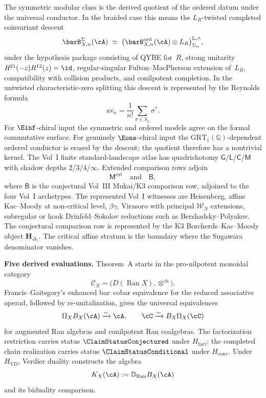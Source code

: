 The symmetric modular class is the derived quotient of the ordered
datum under the universal conductor. In the braided case this means
the $L_R$-twisted completed coinvariant descent
\[
 \barB^\Sigma_{X,n}(\cA)
 \;\simeq\;
 \bigl(\barB^{\mathrm{ord}}_{X,n}(\cA)\otimes L_R\bigr)
 ^{\mathbb L,\wedge}_{\Sigma_n},
\]
under the hypothesis package consisting of QYBE for~$R$, strong
unitarity $R^{21}(-z)R^{12}(z)=\id$, regular-singular
Fulton--MacPherson extension of~$L_R$, compatibility with collision
products, and conilpotent completion. In the untwisted
characteristic-zero splitting this descent is represented by the
Reynolds formula
\[
 \mathrm{av}_n=\frac1{n!}\sum_{\sigma\in S_n}\sigma^*.
\]
For $\Einf$-chiral input the symmetric and ordered models agree on the
formal commutative surface. For genuinely $\Eone$-chiral input the
$\mathrm{GRT}_1(\mathbb Q)$-dependent ordered conductor is erased by
the descent; the quotient therefore has a nontrivial kernel. The Vol~I finite
standard-landscape atlas has quadrichotomy
$\mathsf G/\mathsf L/\mathsf C/\mathsf M$ with shadow depths
$2/3/4/\infty$. Extended comparison rows adjoin
\[
\mathsf M^{\mathrm{ext}}\quad\text{and}\quad\mathsf B,
\]
where $\mathsf B$ is the conjectural Vol~III Mukai/K3 comparison row,
adjoined to the four Vol~I archetypes. The represented Vol~I witnesses are
Heisenberg, affine Kac--Moody at
non-critical level, $\beta\gamma$, Virasoro with principal
$\mathcal W_N$ extensions, subregular or hook Drinfeld--Sokolov
reductions such as Bershadsky--Polyakov.  The conjectural comparison
row is represented by the K3 Borcherds--Kac--Moody object
$\mathbf H_{\Delta_5}$. The critical affine stratum is the boundary
where the Sugawara denominator vanishes.

\medskip
\noindent\textbf{Five derived evaluations.}\enspace
Theorem~A starts in the pro-nilpotent monoidal category
\[
 \mathcal C_X=\bigl(D(\operatorname{Ran}X),\otimes^{\mathrm{ch}}\bigr).
\]
Francis--Gaitsgory's enhanced bar--cobar equivalence for the reduced
associative operad, followed by re-unitalization, gives the universal
equivalences
\[
 \Omega_XB_X(\cA)\xrightarrow{\sim}\cA,
 \qquad
 \cC\xrightarrow{\sim}B_X\Omega_X(\cC)
\]
for augmented Ran algebras and conilpotent Ran coalgebras.  The
factorization restriction carries status \(\ClaimStatusConjectured\)
under \(H_{\mathrm{fact}}\); the completed chain realization carries
status \(\ClaimStatusConditional\) under \(H_{\mathrm{conv}}\).
Under \(H_{\mathrm{VD}}\), Verdier duality constructs the algebra
\[
 K_X(\cA):=\mathbb D_{\operatorname{Ran}}B_X(\cA)
\]
and its biduality comparison.

